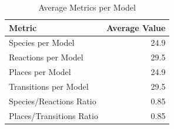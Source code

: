 \begin{table}[htbp]
\centering
\caption{Average Metrics per Model}
\label{tab:average-metrics}
\begin{tabular}{lr}
\toprule
\textbf{Metric} & \textbf{Average Value} \\
\midrule
Species per Model & 24.9 \\
Reactions per Model & 29.5 \\
Places per Model & 24.9 \\
Transitions per Model & 29.5 \\
\midrule
Species/Reactions Ratio & 0.85 \\
Places/Transitions Ratio & 0.85 \\
\bottomrule
\end{tabular}
\end{table}

